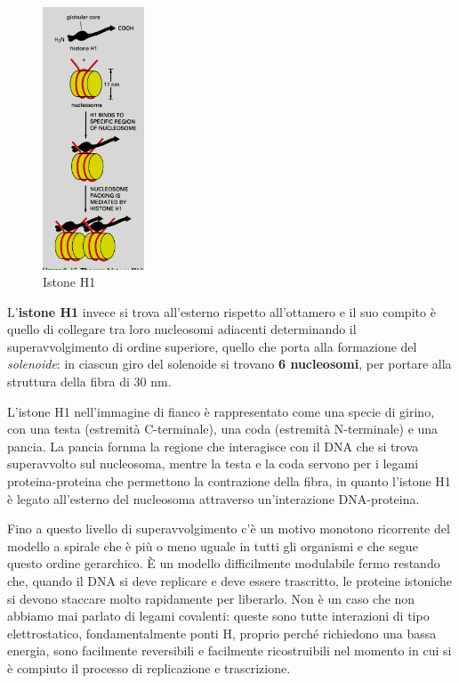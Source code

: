 \documentclass[11pt]{book}
\begin{document}
\begin{figure}
    \includegraphics[width=0.27\textwidth]{img/23_histoneH1.png}
  \caption{Istone H1}
\end{figure}

L’\textbf{istone H1} invece si trova all’esterno rispetto all’ottamero e il suo compito è quello di collegare tra loro nucleosomi adiacenti determinando il superavvolgimento di ordine superiore, quello che porta alla formazione del \emph{solenoide}: in ciascun giro del solenoide si trovano \textbf{6 nucleosomi}, per portare alla struttura della fibra di 30 nm.

L’istone H1 nell’immagine di fianco è rappresentato come una specie di girino, con una testa (estremità C-terminale), una coda (estremità N-terminale) e una pancia. 
La pancia fornma la regione che interagisce con il DNA che si trova superavvolto sul nucleosoma, mentre la testa e la coda servono per i legami proteina-proteina che permettono la contrazione della fibra, in quanto l’istone H1 è legato all’esterno del nucleosoma attraverso un'interazione DNA-proteina.

Fino a questo livello di superavvolgimento c’è un motivo monotono ricorrente del modello a spirale che è più o meno uguale in tutti gli organismi e che segue questo ordine gerarchico. È un modello difficilmente modulabile fermo restando che, quando il DNA si deve replicare e deve essere trascritto, le proteine istoniche si devono staccare molto rapidamente per liberarlo.
Non è un caso che non abbiamo mai parlato di legami covalenti: queste sono tutte interazioni di tipo elettrostatico, fondamentalmente ponti H, proprio perché richiedono una bassa energia, sono facilmente reversibili e facilmente ricostruibili nel momento in cui si è compiuto il processo di replicazione e trascrizione.
\end{document}
